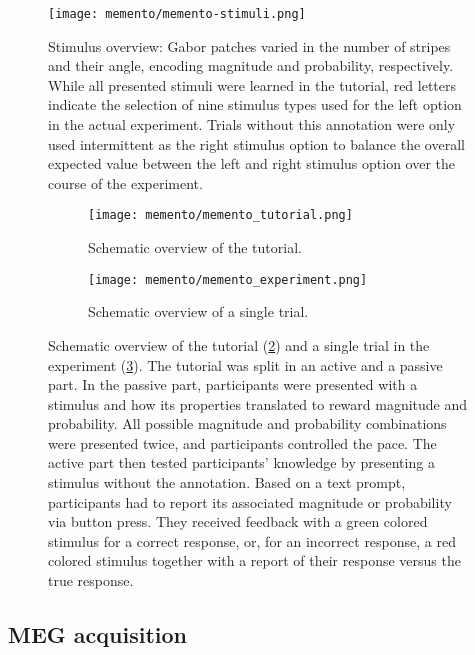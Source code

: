 \begin{figure}
	\centering
	\texttt{[image: memento/memento-stimuli.png]}
	\caption[Stimulus overview]{Stimulus overview: Gabor patches varied in the number of stripes and their angle, encoding magnitude and probability, respectively. While all presented stimuli were learned in the tutorial, red letters indicate the selection of nine stimulus types used for the left option in the actual experiment. Trials without this annotation were only used intermittent as the right stimulus option to balance the overall expected value between the left and right stimulus option over the course of the experiment.}
	\label{fig:memento_stim}
\end{figure}

\begin{figure}
	\begin{subfigure}{.54\textwidth}
	\texttt{[image: memento/memento\_tutorial.png]}
	\caption{Schematic overview of the tutorial.}
	\label{fig:memento_tutorial}
	\end{subfigure}
	\begin{subfigure}{.45\textwidth}
	\texttt{[image: memento/memento\_experiment.png]}
	\caption{Schematic overview of a single trial.}
	\label{fig:memento_trial}
\end{subfigure}
	\caption[Memento: Tutorial and trial overview]{Schematic overview of the tutorial (\ref{fig:memento_tutorial}) and a single trial in the experiment (\ref{fig:memento_trial}).
	The tutorial was split in an active and a passive part.
	In the passive part, participants were presented with a stimulus and how its properties translated to reward magnitude and probability. All possible magnitude and probability combinations were presented twice, and participants controlled the pace. The active part then tested participants' knowledge by presenting a stimulus without the annotation. Based on a text prompt, participants had to report its associated magnitude or probability via button press. They received feedback with a green colored stimulus for a correct response, or, for an incorrect response, a red colored stimulus together with a report of their response versus the true response.
	}
\label{fig:memento}
\end{figure}


\subsection{MEG acquisition}

